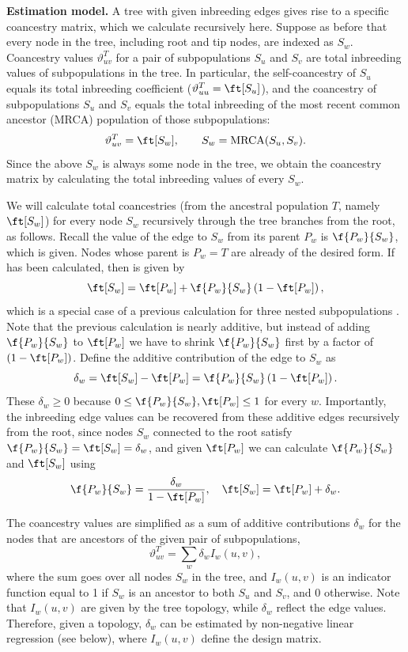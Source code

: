 \documentclass[11pt]{article}
\begin{document}
\textbf{Estimation model.}
A tree with given inbreeding edges gives rise to a specific coancestry matrix, which we calculate recursively here.
Suppose as before that every node in the tree, including root and tip nodes, are indexed as $S_w$.
Coancestry values $\vartheta_{uv}^T$ for a pair of subpopulations $S_u$ and $S_v$ are total inbreeding values of subpopulations in the tree.
In particular, the self-coancestry of $S_u$ equals its total inbreeding coefficient ($\vartheta_{uu}^T = \ft[S_u]$), and the coancestry of subpopulations $S_u$ and $S_v$ equals the total inbreeding of the most recent common ancestor (MRCA) population of those subpopulations:
$$
\vartheta_{uv}^T
=
\ft[ S_w ]
,
\quad\quad
S_w = \text{MRCA}( S_u, S_v )
.
$$
Since the above $S_w$ is always some node in the tree, we obtain the coancestry matrix by calculating the total inbreeding values of every $S_w$.

We will calculate total coancestries (from the ancestral population $T$, namely $\ft[S_w]$) for every node $S_w$ recursively through the tree branches from the root, as follows.
Recall the value of the edge to $S_w$ from its parent $P_w$ is $\f{P_w}{S_w}$, which is given.
Nodes whose parent is $P_w = T$ are already of the desired form.
If \ft[P_w] has been calculated, then \ft[S_w] is given by
$$
\ft[S_w] = \ft[P_w] + \f{P_w}{S_w} \left( 1 - \ft[P_w] \right),
$$
which is a special case of a previous calculation for three nested subpopulations \citep{ochoa_fst1}.
Note that the previous calculation is nearly additive, but instead of adding $\f{P_w}{S_w}$ to $\ft[P_w]$ we have to shrink $\f{P_w}{S_w}$ first by a factor of $\left( 1 - \ft[P_w] \right)$.
Define the additive contribution of the edge to $S_w$ as
$$
\delta_w = \ft[S_w] - \ft[P_w] = \f{P_w}{S_w} \left( 1 - \ft[P_w] \right).
$$
These $\delta_w \ge 0$ because $0 \le \f{P_w}{S_w}, \ft[P_w] \le 1$ for every $w$.
Importantly, the inbreeding edge values can be recovered from these additive edges recursively from the root, since nodes $S_w$ connected to the root satisfy
$\f{P_w}{S_w} = \ft[S_w] = \delta_w$,
and given $\ft[P_w]$ we can calculate $\f{P_w}{S_w}$ and $\ft[S_w]$ using
\begin{equation*}
  \f{P_w}{S_w}
  =
  \frac{ \delta_w }{ 1 - \ft[P_w] },
  \quad
  \ft[S_w]
  =
  \ft[P_w] + \delta_w
  .
\end{equation*}

The coancestry values are simplified as a sum of additive contributions $\delta_w$ for the nodes that are ancestors of the given pair of subpopulations,
\begin{equation}
  \label{eq:coanc_tree_additive}
  \vartheta_{uv}^T
  =
  \sum_w \delta_w I_w(u,v)
  ,
\end{equation}
where the sum goes over all nodes $S_w$ in the tree, and $I_w(u,v)$ is an indicator function equal to 1 if $S_w$ is an ancestor to both $S_u$ and $S_v$, and 0 otherwise.
Note that $I_w(u,v)$ are given by the tree topology, while $\delta_w$ reflect the edge values.
Therefore, given a topology, $\delta_w$ can be estimated by non-negative linear regression (see below), where $I_w(u,v)$ define the design matrix.
\end{document}
